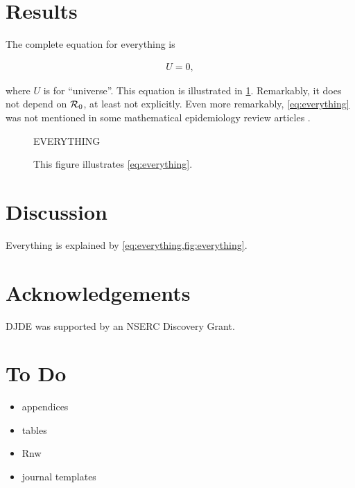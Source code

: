 \documentclass[9pt,twocolumn,twoside]{pnas/pnas_research_article/pnas-new}
\begin{document}
\section{Results}\label{sec:results}

The complete equation for everything is
\begin{linenomath*}
\begin{align}\label{eq:everything}
  U = 0,
\end{align}
\end{linenomath*}
where $U$ is for ``universe''.  This equation is illustrated
in \cref{fig:everything}.  Remarkably, it does not depend on ${\mathcal R}_0$,
at least not explicitly.  Even more remarkably, \cref{eq:everything}
was not mentioned in some mathematical epidemiology review articles
\cite{Earn+02,Earn04,Earn08,Earn09}.

\begin{figure}
  \begin{center}
    \Huge EVERYTHING
  \end{center}
  \caption{This figure illustrates \cref{eq:everything}.}
  \label{fig:everything}
\end{figure}

\section{Discussion}\label{sec:discussion}

Everything is explained by \cref{eq:everything,fig:everything}.

\section*{Acknowledgements}

DJDE was supported by an NSERC Discovery Grant.


\ifpnas
\else
  
\fi




\appendix

\section{To Do}\label{app:ToDo}

\begin{itemize}
\item appendices
\item tables
\item Rnw
\item journal templates
\end{itemize}
\end{document}

